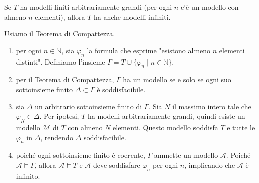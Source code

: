 \documentclass[a4paper,11pt]{report}
\begin{document}
\begin{lemmaframe}{}{}
    Se \( T \) ha modelli finiti arbitrariamente grandi (per ogni \( n \) c'è un modello con almeno \( n \) elementi), allora \( T \) ha anche modelli infiniti.
\end{lemmaframe}
\begin{pframe}
    Usiamo il Teorema di Compattezza.
    \begin{enumerate}
        \item per ogni \( n \in \mathbb{N} \), sia \( \varphi_n \) la formula che esprime "esistono almeno \( n \) elementi distinti". Definiamo l'insieme \( \Gamma = T \cup \{ \varphi_n \mid n \in \mathbb{N} \} \).
        
        \item per il Teorema di Compattezza, \( \Gamma \) ha un modello se e solo se ogni suo sottoinsieme finito \( \Delta \subset \Gamma \) è soddisfacibile.
        
        \item sia \( \Delta \) un arbitrario sottoinsieme finito di \( \Gamma \). Sia \( N \) il massimo intero tale che \( \varphi_N \in \Delta \). Per ipotesi, \( T \) ha modelli arbitrariamente grandi, quindi esiste un modello \( \mathcal{M} \) di \( T \) con almeno \( N \) elementi. Questo modello soddisfa \( T \) e tutte le \( \varphi_n \) in \( \Delta \), rendendo \( \Delta \) soddisfacibile.
        
        \item poiché ogni sottoinsieme finito è coerente, \( \Gamma \) ammette un modello \( \mathcal{A} \). Poiché \( \mathcal{A} \models \Gamma \), allora \( \mathcal{A} \models T \) e \( \mathcal{A} \) deve soddisfare \( \varphi_n \) per ogni \( n \), implicando che \( \mathcal{A} \) è infinito.
    \end{enumerate}
\end{pframe}
\end{document}
